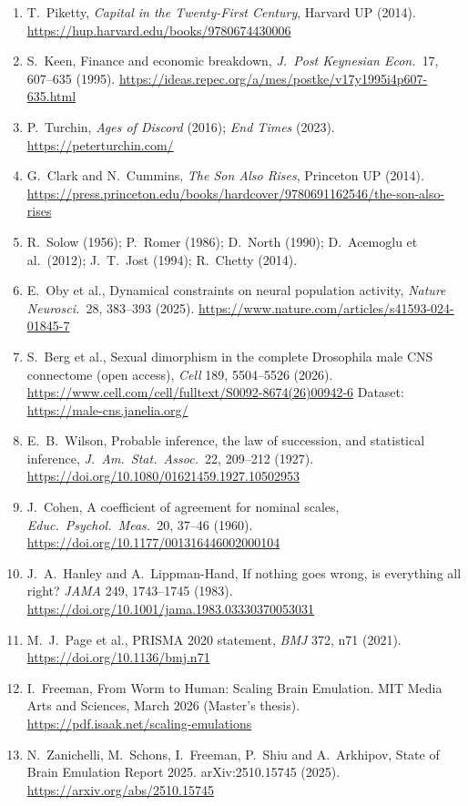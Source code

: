 \documentclass[11pt,a4paper]{article}
\begin{document}
\begin{enumerate}
\item T.~Piketty, \textit{Capital in the Twenty-First Century}, Harvard UP (2014). \url{https://hup.harvard.edu/books/9780674430006}
\item S.~Keen, Finance and economic breakdown, \textit{J.\ Post Keynesian Econ.\ }17, 607--635 (1995). \url{https://ideas.repec.org/a/mes/postke/v17y1995i4p607-635.html}
\item P.~Turchin, \textit{Ages of Discord} (2016); \textit{End Times} (2023). \url{https://peterturchin.com/}
\item G.~Clark and N.~Cummins, \textit{The Son Also Rises}, Princeton UP (2014). \url{https://press.princeton.edu/books/hardcover/9780691162546/the-son-also-rises}
\item R.~Solow (1956); P.~Romer (1986); D.~North (1990); D.~Acemoglu et al.\ (2012); J.~T.~Jost (1994); R.~Chetty (2014).
\item E.~Oby et al., Dynamical constraints on neural population activity, \textit{Nature Neurosci.\ }28, 383--393 (2025). \url{https://www.nature.com/articles/s41593-024-01845-7}
\item S.~Berg et al., Sexual dimorphism in the complete Drosophila male CNS connectome (open access), \textit{Cell} 189, 5504--5526 (2026). \url{https://www.cell.com/cell/fulltext/S0092-8674(26)00942-6} Dataset: \url{https://male-cns.janelia.org/}
\item E.~B.~Wilson, Probable inference, the law of succession, and statistical inference, \textit{J.~Am.~Stat.~Assoc.\ }22, 209--212 (1927). \url{https://doi.org/10.1080/01621459.1927.10502953}
\item J.~Cohen, A coefficient of agreement for nominal scales, \textit{Educ.~Psychol.~Meas.\ }20, 37--46 (1960). \url{https://doi.org/10.1177/001316446002000104}
\item J.~A.~Hanley and A.~Lippman-Hand, If nothing goes wrong, is everything all right? \textit{JAMA} 249, 1743--1745 (1983). \url{https://doi.org/10.1001/jama.1983.03330370053031}
\item M.~J.~Page et al., PRISMA 2020 statement, \textit{BMJ} 372, n71 (2021). \url{https://doi.org/10.1136/bmj.n71}
\item I.~Freeman, From Worm to Human: Scaling Brain Emulation. MIT Media Arts and Sciences, March 2026 (Master's thesis). \url{https://pdf.isaak.net/scaling-emulations}
\item N.~Zanichelli, M.~Schons, I.~Freeman, P.~Shiu and A.~Arkhipov, State of Brain Emulation Report 2025. arXiv:2510.15745 (2025). \url{https://arxiv.org/abs/2510.15745}

\end{enumerate}
\end{document}

